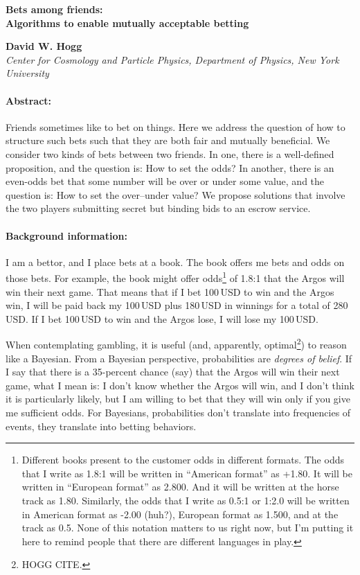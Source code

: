 \documentclass{article}
\begin{document}
\noindent
\textbf{Bets among friends:\\ Algorithms to enable mutually acceptable betting}

\medskip
\noindent
\textbf{David W. Hogg}\\
\textit{Center for Cosmology and Particle Physics, Department of Physics, New York University}

\paragraph{Abstract:}
Friends sometimes like to bet on things.
Here we address the question of how to structure such bets such that they are both fair and mutually beneficial.
We consider two kinds of bets between two friends.
In one, there is a well-defined proposition, and the question is:
How to set the odds?
In another, there is an even-odds bet that some number will be over or under some value, and the question is:
How to set the over--under value?
We propose solutions that involve the two players submitting secret but binding bids to an escrow service.

\paragraph{Background information:}
I am a bettor, and I place bets at a book.
The book offers me bets and odds on those bets.
For example, the book might offer odds\footnote{%
Different books present to the customer odds in different formats.
The odds that I write as 1.8:1 will be written in ``American format'' as +1.80.
It will be written in ``European format'' as 2.800.
And it will be written at the horse track as 1.80.
Similarly, the odds that I write as 0.5:1 or 1:2.0 will be written in American format as -2.00 (huh?),
European format as 1.500,
and at the track as 0.5.
None of this notation matters to us right now, but I'm putting it here to remind people that there are
different languages in play.}
of 1.8:1 that the Argos will win their next game.
That means that if I bet 100\,USD to win and the Argos win, I will be paid back my 100\,USD plus 180\,USD in winnings for a total of 280\,USD.
If I bet 100\,USD to win and the Argos lose, I will lose my 100\,USD.

When contemplating gambling, it is useful (and, apparently, optimal\footnote{HOGG CITE.}) to reason like a Bayesian.
From a Bayesian perspective, probabilities are \emph{degrees of belief}.
If I say that there is a 35-percent chance (say) that the Argos will win their next game, what I mean is:
I don't know whether the Argos will win, and I don't think it is particularly likely,
but I am willing to bet that they will win only if you give me sufficient odds.
For Bayesians, probabilities don't translate into frequencies of events, they translate into betting
behaviors.
\end{document}
